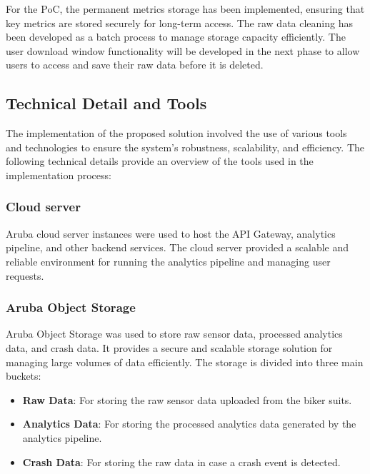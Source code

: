 For the PoC, the permanent metrics storage has been implemented, ensuring that key metrics are stored securely for long-term access. The raw data cleaning has been developed as a batch process to manage storage capacity efficiently. The user download window functionality will be developed in the next phase to allow users to access and save their raw data before it is deleted.

\subsection{Technical Detail and Tools}
The implementation of the proposed solution involved the use of various tools and technologies to ensure the system's robustness, scalability, and efficiency. The following technical details provide an overview of the tools used in the implementation process:
\subsubsection{Cloud server}
Aruba cloud server instances were used to host the API Gateway, analytics pipeline, and other backend services. The cloud server provided a scalable and reliable environment for running the analytics pipeline and managing user requests.

\subsubsection{Aruba Object Storage}
Aruba Object Storage was used to store raw sensor data, processed analytics data, and crash data. It provides a secure and scalable storage solution for managing large volumes of data efficiently.
The storage is divided into three main buckets:
\begin{itemize}
    \item \textbf{Raw Data}: For storing the raw sensor data uploaded from the biker suits.
    \item \textbf{Analytics Data}: For storing the processed analytics data generated by the analytics pipeline.
    \item \textbf{Crash Data}: For storing the raw data in case a crash event is detected.
\end{itemize}


